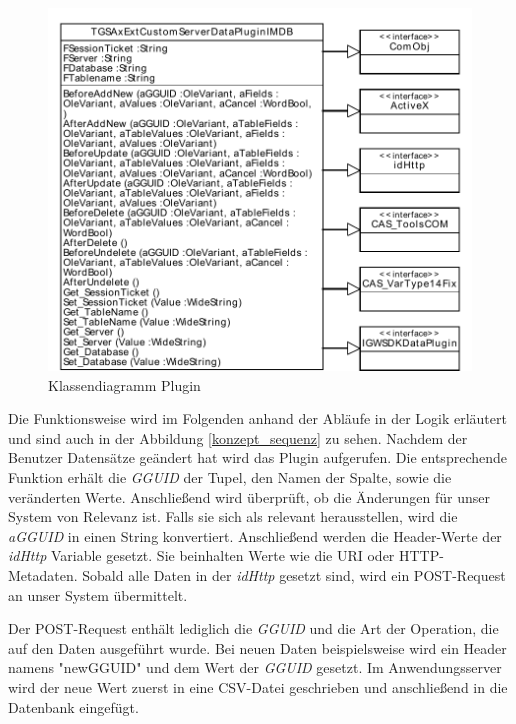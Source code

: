 \begin{figure}[htbp]
\centering
\includegraphics[scale=0.7]{pics/plugin_klassendiagramm.pdf}
\caption{Klassendiagramm Plugin}
\label{ergebniss_plugin_klassendiagramm}
\end{figure}

Die Funktionsweise wird im Folgenden anhand der Abläufe in der Logik erläutert und sind auch in der Abbildung \ref{konzept_sequenz} zu sehen. Nachdem der Benutzer Datensätze geändert hat wird das Plugin aufgerufen. Die entsprechende Funktion erhält die \textit{GGUID} der Tupel, den Namen der Spalte, sowie die veränderten Werte. Anschließend wird überprüft, ob die Änderungen für unser System von Relevanz ist. Falls sie sich als relevant herausstellen, wird die \textit{aGGUID} in einen String konvertiert. Anschließend werden die Header-Werte der \textit{idHttp} Variable gesetzt. Sie beinhalten Werte wie die URI oder HTTP-Metadaten. Sobald alle Daten in der \textit{idHttp} gesetzt sind, wird ein POST-Request an unser System übermittelt. 

Der POST-Request enthält lediglich die \textit{GGUID} und die Art der Operation, die auf den Daten ausgeführt wurde. Bei neuen Daten beispielsweise wird ein Header namens "newGGUID" und dem Wert der \textit{GGUID} gesetzt. Im Anwendungsserver wird der neue Wert zuerst in eine CSV-Datei geschrieben und anschließend in die Datenbank eingefügt.


